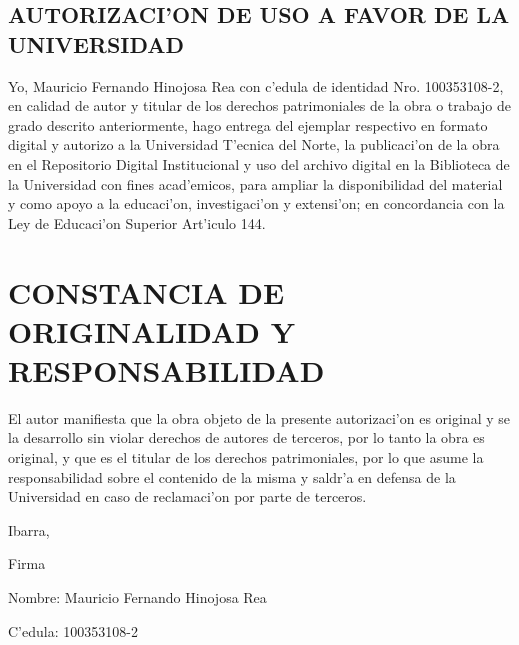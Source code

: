 \begin{center}
\section*{\normalsize AUTORIZACI'ON DE USO A FAVOR DE LA UNIVERSIDAD }
\end{center}

 Yo, Mauricio Fernando Hinojosa Rea con c'edula de identidad Nro. 100353108-2, en calidad de autor y titular de los derechos patrimoniales de la obra o trabajo de grado descrito anteriormente, hago entrega del ejemplar respectivo en formato digital y autorizo a la Universidad T'ecnica del Norte, la publicaci'on de la obra en el Repositorio Digital Institucional y uso del archivo digital en la Biblioteca de la Universidad con fines acad'emicos, para ampliar la disponibilidad del material y como apoyo a la educaci'on, investigaci'on y extensi'on; en concordancia con la Ley de Educaci'on Superior Art'iculo 144. 

\vspace{3cm}



\section*{\normalsize CONSTANCIA DE ORIGINALIDAD Y RESPONSABILIDAD}




El autor manifiesta que la obra objeto de la presente autorizaci'on es original y se la desarrollo sin violar derechos de autores de terceros, por lo tanto la obra es original, y que es el titular de los derechos patrimoniales, por lo que asume la responsabilidad sobre el contenido de la misma y saldr'a en defensa de la Universidad en caso de reclamaci'on por parte de terceros. 

\vspace{5cm}
\begin{flushright}
Ibarra, \shortdate
\end{flushright}

\vspace{2cm}


\begin{center}

Firma 
\end{center}
\begin{center}

Nombre: Mauricio Fernando Hinojosa Rea

\end{center}
\begin{center}
C'edula: 100353108-2

\end{center}